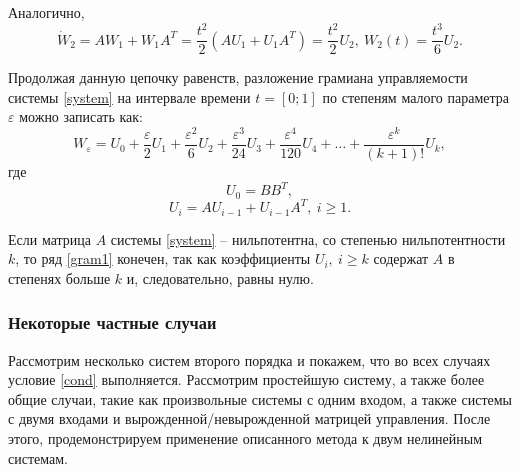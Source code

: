 \documentclass[../main.tex]{subfiles}
\begin{document}
 Аналогично,
 \begin{equation*}
	 \dot{W}_2 = A W_1 + W_1 A^T = \dfrac{t^2}{2} \left( A U_1 + U_1 A^T \right) = \dfrac{t^2}{2} U_2 ,  \ W_2(t) = \dfrac{t^3}{6}U_2.
 \end{equation*}
 
 Продолжая данную цепочку равенств, разложение грамиана управляемости системы \eqref{system} на интервале времени $t = [0;1] $ по степеням малого параметра $ \varepsilon $ можно записать как:
 \begin{equation}\label{gram1}
	 W_{\varepsilon} = U_0 + \dfrac{\varepsilon}{2}U_1 + \dfrac{\varepsilon^2}{6} U_2 + \dfrac{\varepsilon^3}{24}U_3 + \dfrac{\varepsilon^4}{120}U_4 + \dots + \dfrac{\varepsilon^k}{(k+1)!}U_k,
 \end{equation}
 где
 \begin{equation*}
	 U_0 = B B^T,
 \end{equation*}
 \begin{equation*}
	 U_i  = A U_{i-1} + U_{i-1} A^T, \ i \geq 1.
 \end{equation*}
 
 Если матрица $ A $ системы \eqref{system} -- нильпотентна, со степенью нильпотентности $ k $, то ряд \eqref{gram1} конечен, так как коэффициенты $ U_i, \ i \geq k$ содержат $ A $ в степенях больше $ k$ и, следовательно, равны нулю.  
 \subsubsection{Некоторые частные случаи}
 Рассмотрим несколько систем второго порядка и покажем, что во всех случаях условие \eqref{cond} выполняется. Рассмотрим простейшую систему, а также более общие случаи, такие как произвольные системы с одним входом, а также системы с двумя входами и вырожденной/невырожденной матрицей управления. После этого, продемонстрируем применение описанного метода к двум нелинейным системам.
\end{document}
